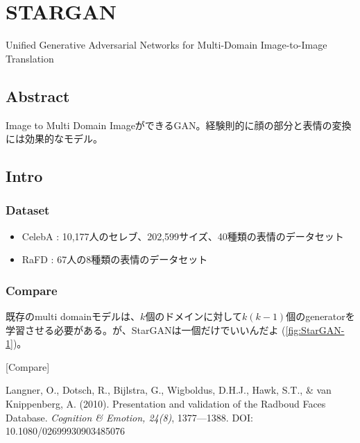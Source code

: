 \documentclass[12pt,fleqn,dvipdfmx]{jarticle}
\begin{document}
  \section{STARGAN}
    Unified Generative Adversarial Networks for Multi-Domain Image-to-Image Translation \cite{StarGAN2018}
  \subsection{Abstract}
    Image to Multi Domain ImageができるGAN。経験則的に顔の部分と表情の変換には効果的なモデル。
  \subsection{Intro}
    \subsubsection{Dataset}
      \begin{itemize}
        \item CelebA\cite{CelebA} : 10,177人のセレブ、202,599サイズ、40種類の表情のデータセット
        \item RaFD\cite{RaFD} : 67人の8種類の表情のデータセット
      \end{itemize}
    \subsubsection{Compare}
      既存のmulti domainモデルは、$k$個のドメインに対して$k(k-1)$個のgeneratorを学習させる必要がある。が、StarGANは一個だけでいいんだよ
      (\ref{fig:StarGAN-1})。

      [Compare]

  \newpage
  \begin{thebibliography}{99}


      Langner, O., Dotsch, R., Bijlstra, G., Wigboldus, D.H.J., Hawk, S.T., \& van Knippenberg, A.
      (2010). Presentation and validation of the Radboud Faces Database.
      \textit{Cognition \& Emotion, 24(8)}, 1377—1388. DOI: 10.1080/02699930903485076
  \end{thebibliography}

  
\end{document}
